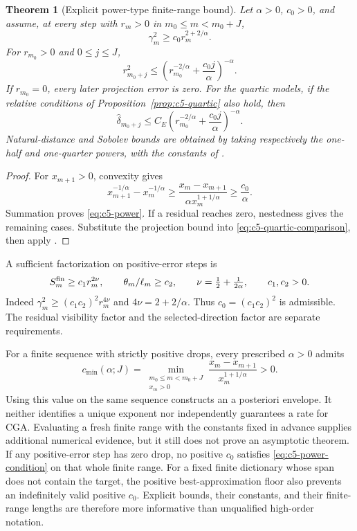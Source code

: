 \documentclass[11pt]{article}
\newtheorem{theorem}{Theorem}[section]
\theoremstyle{remark}
\begin{document}
\begin{theorem}[Explicit power-type finite-range bound]
\label{thm:c5-power}
Let $\alpha>0$, $c_0>0$, and assume, at every step with $r_m>0$
in $m_0\leq m<m_0+J$,
\begin{equation}
 \gamma_m^2\geq c_0r_m^{2+2/\alpha}.
 \label{eq:c5-power-condition}
\end{equation}
For $r_{m_0}>0$ and $0\leq j\leq J$,
\begin{equation}
 r_{m_0+j}^2\leq
 \left(r_{m_0}^{-2/\alpha}+\frac{c_0j}{\alpha}\right)^{-\alpha}.
 \label{eq:c5-power}
\end{equation}
If $r_{m_0}=0$, every later projection error is zero.
For the quartic models, if the relative conditions of
Proposition~\ref{prop:c5-quartic} also hold, then
\begin{equation}
 \widehat\delta_{m_0+j}\leq C_E
 \left(r_{m_0}^{-2/\alpha}+\frac{c_0j}{\alpha}\right)^{-\alpha}.
 \label{eq:c5-power-energy}
\end{equation}
Natural-distance and Sobolev bounds are obtained by taking respectively
the one-half and one-quarter powers, with the constants of
\CGAEnergyTheoremReference.
\end{theorem}
\begin{proof}
For $x_{m+1}>0$, convexity gives
\[
 x_{m+1}^{-1/\alpha}-x_m^{-1/\alpha}
 \geq\frac{x_m-x_{m+1}}{\alpha x_m^{1+1/\alpha}}
 \geq\frac{c_0}{\alpha}.
\]
Summation proves \eqref{eq:c5-power}. If a residual reaches zero,
nestedness gives the remaining cases. Substitute the projection bound
into \eqref{eq:c5-quartic-comparison}, then apply
\CGAEnergyTheoremReference.
\end{proof}

A sufficient factorization on positive-error steps is
\begin{equation}
 S_m^{\rm fin}\geq c_1r_m^{2\nu},\qquad
 \theta_m/\ell_m\geq c_2,\qquad
 \nu=\tfrac12+\tfrac1{2\alpha},\qquad c_1,c_2>0 .
 \label{eq:c5-power-factors}
\end{equation}
Indeed $\gamma_m^2\geq(c_1c_2)^2r_m^{4\nu}$ and
$4\nu=2+2/\alpha$. Thus $c_0=(c_1c_2)^2$ is admissible.
The residual visibility factor and the selected-direction factor are
separate requirements.

For a finite sequence with strictly positive drops, every prescribed
$\alpha>0$ admits
\[
 c_{\min}(\alpha;J)=
 \min_{\substack{m_0\leq m<m_0+J\\x_m>0}}
 \frac{x_m-x_{m+1}}{x_m^{1+1/\alpha}}>0 .
\]
Using this value on the same sequence constructs an a posteriori
envelope. It neither identifies a unique exponent nor independently
guarantees a rate for CGA. Evaluating a fresh finite range with the constants
fixed in advance supplies additional numerical evidence, but it still
does not prove an asymptotic theorem.
If any positive-error step has zero drop, no positive $c_0$ satisfies
\eqref{eq:c5-power-condition} on that whole finite range.
For a fixed finite dictionary whose span does not contain the target,
the positive best-approximation floor also prevents an indefinitely
valid positive $c_0$. Explicit bounds, their constants, and their
finite-range lengths are therefore more informative than unqualified
high-order notation.
\end{document}
